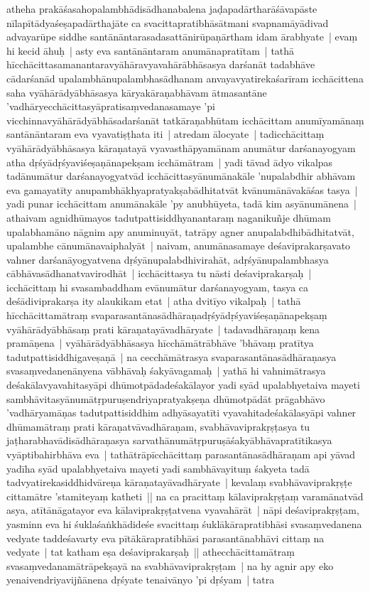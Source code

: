 \documentclass[article,12pt,a4paper]{memoir}%
\newcounter{parCount}
\begin{document}
	  \pstart \leavevmode%
	\label{thakur75-145.3}atheha prakāśasahopalambhādisādhanabalena jaḍapadārtharāśāvapāste nīlapītādyaśeṣapadārthajāte ca svacittapratibhāsātmani svapnamāyādivad advayarūpe siddhe santānāntarasadasattānirūpaṇārtham idam ārabhyate | \label{thakur75-145.6} evaṃ hi kecid āhuḥ | asty eva santānāntaram anumānapratītam | tathā hīcchācittasamanantaravyāhāravyavahārābhāsasya darśanāt tadabhāve cādarśanād upalambhānupalambhasādhanam anvayavyatirekaśarīram icchācittena saha vyāhārādyābhāsasya kāryakāraṇabhāvam ātmasantāne 'vadhāryecchācittasyāpratisaṃvedanasamaye 'pi vicchinnavyāhārādyābhāsadarśanāt tatkāraṇabhūtam icchācittam anumīyamānaṃ santānāntaram eva vyavatiṣṭhata iti | \label{thakur75-145.12} atredam ālocyate | tadicchācittaṃ vyāhārādyābhāsasya kāraṇatayā vyavasthāpyamānam anumātur darśanayogyam atha dṛśyādṛśyaviśeṣaṇānapekṣam icchāmātram | yadi tāvad ādyo vikalpas tadānumātur darśanayogyatvād icchācittasyānumānakāle 'nupalabdhir abhāvam eva gamayatīty anupambhākhyapratyakṣabādhitatvāt kvānumānāvakāśas tasya | yadi punar icchācittam anumānakāle 'py anubhūyeta, tadā kim asyānumānena | athaivam agnidhūmayos tadutpattisiddhyanantaraṃ naganikuñje dhūmam upalabhamāno nāgnim apy anuminuyāt, tatrāpy agner anupalabdhibādhitatvāt, upalambhe cānumānavaiphalyāt | naivam, anumānasamaye deśaviprakarṣavato vahner darśanāyogyatvena dṛśyānupalabdhivirahāt, adṛśyānupalambhasya cābhāvasādhanatvavirodhāt | icchācittasya tu nāsti deśaviprakarṣaḥ | icchācittaṃ hi svasambaddham evānumātur darśanayogyam, tasya ca deśādiviprakarṣa ity alaukikam etat | \label{thakur75-145.23} atha dvitīyo vikalpaḥ | tathā hīcchācittamātraṃ svaparasantānasādhāraṇadṛśyādṛśyaviśeṣaṇānapekṣaṃ vyāhārādyābhāsaṃ prati kāraṇatayāvadhāryate | tadavadhāraṇaṃ kena pramāṇena | vyāhārādyābhāsasya hīcchāmātrābhāve 'bhāvaṃ pratītya tadutpattisiddhigaveṣaṇā | na cecchāmātrasya svaparasantānasādhāraṇasya svasaṃvedanenānyena vābhāvaḥ śakyāvagamaḥ | yathā hi vahnimātrasya deśakālavyavahitasyāpi dhūmotpādadeśakālayor yadi syād upalabhyetaiva mayeti sambhāvitasyānumātṛpuruṣendriyapratyakṣeṇa dhūmotpādāt prāgabhāvo 'vadhāryamāṇas tadutpattisiddhim adhyāsayatīti vyavahitadeśakālasyāpi vahner dhūmamātraṃ prati kāraṇatvāvadhāraṇam, svabhāvaviprakṛṣṭasya tu jaṭharabhavādisādhāraṇasya sarvathānumātṛpuruṣāśakyābhāvapratītikasya vyāptibahirbhāva eva | tathātrāpīcchācittaṃ parasantānasādhāraṇam api yāvad yadīha syād upalabhyetaiva mayeti yadi sambhāvayituṃ śakyeta tadā tadvyatirekasiddhidvāreṇa kāraṇatayāvadhāryate | kevalaṃ svabhāvaviprakṛṣṭe cittamātre 'stamiteyaṃ katheti || \label{thakur75-146.7} na ca pracittaṃ kālaviprakṛṣṭaṃ varamānatvād asya, atītānāgatayor eva kālaviprakṛṣṭatvena vyavahārāt | \label{thakur75-146.9} nāpi deśaviprakṛṣṭam, yasminn eva hi śuklaśaṅkhādideśe svacittaṃ śuklākārapratibhāsi svasaṃvedanena vedyate taddeśavarty eva pītākārapratibhāsi parasantānabhāvi cittaṃ na vedyate | tat katham eṣa deśaviprakarṣaḥ || \label{thakur75-146.12} athecchācittamātraṃ svasaṃvedanamātrāpekṣayā na svabhāvaviprakṛṣṭam | na hy agnir apy eko yenaivendriyavijñānena dṛśyate tenaivānyo 'pi dṛśyam | tatra 
\end{document}
